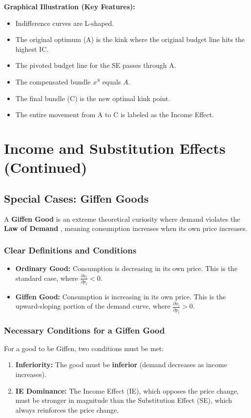 \documentclass{article}
\begin{document}
\textbf{Graphical Illustration (Key Features):}
\begin{itemize}
    \item Indifference curves are L-shaped.
    \item The original optimum (A) is the kink where the original budget line hits the highest IC.
    \item The pivoted budget line for the SE passes through A.
    \item The compensated bundle $x^S$ equals $A$.
    \item The final bundle (C) is the new optimal kink point.
    \item The entire movement from A to C is labeled as the Income Effect.
\end{itemize}

\section{Income and Substitution Effects (Continued)}

\subsection{Special Cases: Giffen Goods}

A \textbf{Giffen Good} is an extreme theoretical curiosity where demand violates the \textbf{Law of Demand} , meaning consumption increases when its own price increases.

\subsubsection*{Clear Definitions and Conditions}
\begin{itemize}
    \item \textbf{Ordinary Good:} Consumption is decreasing in its own price. This is the standard case, where $\frac{\partial x_i}{\partial p_i} < 0$.
    \item \textbf{Giffen Good:} Consumption is increasing in its own price. This is the upward-sloping portion of the demand curve, where $\frac{\partial x_i}{\partial p_i} > 0$.
\end{itemize}

\subsubsection*{Necessary Conditions for a Giffen Good}
For a good to be Giffen, two conditions must be met:
\begin{enumerate}
    \item \textbf{Inferiority:} The good must be \textbf{inferior} (demand decreases as income increases).
    \item \textbf{IE Dominance:} The Income Effect (IE), which opposes the price change, must be stronger in magnitude than the Substitution Effect (SE), which always reinforces the price change.
\end{enumerate}
\end{document}
